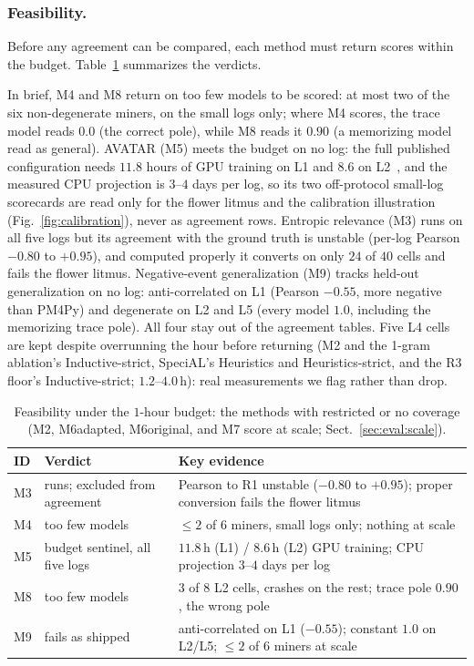 \documentclass[runningheads]{llncs}
\newcommand{\chg}[1]{#1}
\begin{document}
\subsubsection{Feasibility.}
\label{sec:eval:feasibility}
Before any agreement can be compared, each method must return scores within the budget. Table~\ref{tab:feasibility} summarizes the verdicts.



\chg{In brief, M4 and M8 return on too few models to be scored: at most two of the six non-degenerate miners, on the small logs only; where M4 scores, the trace model reads $0.0$ (the correct pole), while M8 reads it $0.90$ (a memorizing model read as general). AVATAR (M5) meets the budget on no log: the full published configuration needs $11.8$ hours of GPU training on L1 and $8.6$ on L2~\cite{theis2020avatar}, and the measured CPU projection is $3$--$4$ days per log, so its two off-protocol small-log scorecards are read only for the flower litmus and the calibration illustration (Fig.~\ref{fig:calibration}), never as agreement rows. Entropic relevance (M3) runs on all five logs but its agreement with the ground truth is unstable (per-log Pearson $-0.80$ to $+0.95$), and computed properly it converts on only $24$ of $40$ cells and fails the flower litmus. Negative-event generalization (M9) tracks held-out generalization on no log: anti-correlated on L1 (Pearson $-0.55$, more negative than PM4Py) and degenerate on L2 and L5 (every model $1.0$, including the memorizing trace pole). All four stay out of the agreement tables. Five L4 cells are kept despite overrunning the hour before returning (M2 and the 1-gram ablation's Inductive-strict, SpeciAL's Heuristics and Heuristics-strict, and the R3 floor's Inductive-strict; $1.2$--$4.0$\,h): real measurements we flag rather than drop.}

\begin{table}[!ht]
\centering
\caption{Feasibility under the $1$-hour budget: the methods with restricted or no coverage (M2, M6adapted, M6original, and M7 score at scale; Sect.~\ref{sec:eval:scale}).}
\label{tab:feasibility}
\setlength{\tabcolsep}{3.5pt}
\footnotesize
\begin{tabular}{@{}l l p{6.1cm}@{}}
\toprule
ID & Verdict & Key evidence \\
\midrule
M3 & runs; excluded from agreement & Pearson to R1 unstable ($-0.80$ to $+0.95$); proper conversion fails the flower litmus \\
M4 & too few models & $\le2$ of $6$ miners, small logs only; nothing at scale \\
M5 & budget sentinel, all five logs & $11.8$\,h (L1) / $8.6$\,h (L2) GPU training; CPU projection $3$--$4$ days per log \\
M8 & too few models & $3$ of $8$ L2 cells, crashes on the rest; trace pole $0.90$, the wrong pole \\
M9 & fails as shipped & anti-correlated on L1 ($-0.55$); constant $1.0$ on L2/L5; $\le2$ of $6$ miners at scale \\
\bottomrule
\end{tabular}
\end{table}
\end{document}
